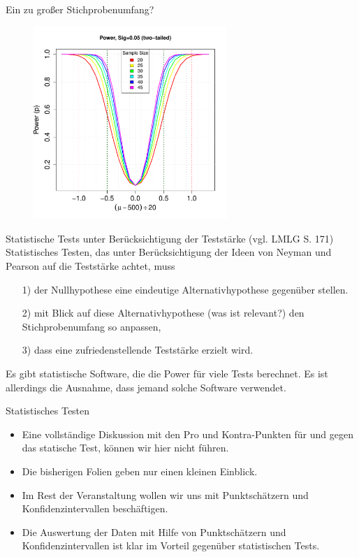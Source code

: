 \documentclass[usenames,dvipsnames,handout]{beamer}
\begin{document}
\begin{frame}{Ein zu großer Stichprobenumfang? }
  \begin{figure}[ht]
 	\centering
 	      \includegraphics[width=0.65\textwidth]{power4.pdf}%
 	\end{figure}
\end{frame}

\begin{frame}{Statistische Tests unter Berücksichtigung der Teststärke (vgl. LMLG S. 171)}
Statistisches Testen, das unter Berücksichtigung der Ideen von Neyman und Pearson auf die Teststärke 
achtet, muss
\begin{itemize}
\item[1)]{der Nullhypothese eine eindeutige Alternativhypothese gegenüber stellen.}
\item[2)]{mit Blick auf diese Alternativhypothese (was ist relevant?) den Stichprobenumfang so
anpassen,}
\item[3)]{dass eine zufriedenstellende Teststärke erzielt wird.}
\end{itemize}\pause
Es gibt statistische Software, die die Power  für viele Tests berechnet. Es ist allerdings
die Ausnahme, dass jemand solche Software verwendet.
\end{frame}
\begin{frame}{Statistisches Testen}
\begin{itemize}
\item{Eine vollständige Diskussion mit den Pro und Kontra-Punkten für und gegen das 
statische Test, können wir hier nicht führen.}
\item{Die bisherigen Folien geben nur einen kleinen Einblick.}
\item{Im Rest der Veranstaltung wollen wir uns mit Punktschätzern und Konfidenzintervallen
beschäftigen.}
\item{Die Auswertung der Daten mit Hilfe von Punktschätzern und Konfidenzintervallen
ist klar im Vorteil gegenüber statistischen Tests.}
\end{itemize}
\end{frame}
\end{document}
